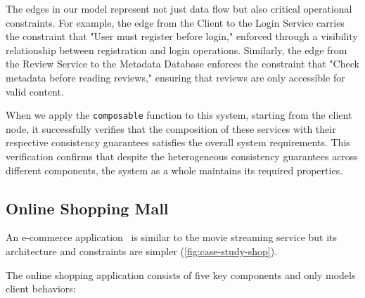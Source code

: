 The edges in our model represent not just data flow but also critical
operational constraints. For example, the edge from the Client to the
Login Service carries the constraint that "User must register before
login," enforced through a visibility relationship between
registration and login operations. Similarly, the edge from the
Review Service to the Metadata Database enforces the constraint that
"Check metadata before reading reviews," ensuring that reviews are only
accessible for valid content.

When we apply the \texttt{composable} function to this system,
starting from the client node, it successfully verifies that the
composition of these services with their respective consistency
guarantees satisfies the overall system requirements.
This verification confirms that despite the heterogeneous consistency
guarantees across different components, the system as a whole
maintains its required properties.

\subsection{Online Shopping Mall}

An e-commerce application~\cite{gan2019an} is similar to the movie
streaming service but its architecture and constraints are simpler
(\cref{fig:case-study-shop}).

The online shopping application consists of five key components and only
models client behaviors:

